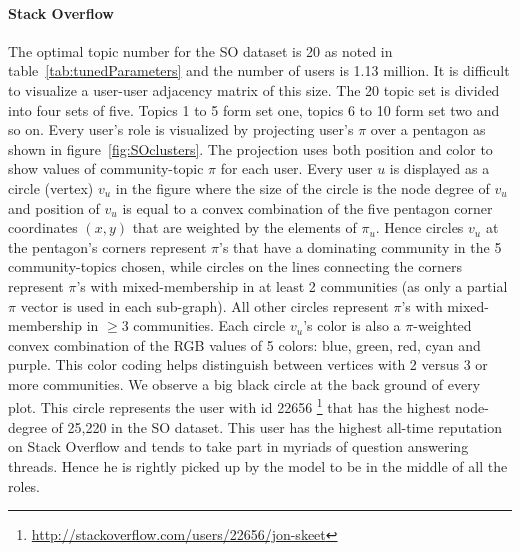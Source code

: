 \documentclass{sig-alternate}
\begin{document}
\vspace*{-0.5\baselineskip}
\paragraph{Stack Overflow} 
The optimal topic number for the SO dataset is 20 as noted in
table~\ref{tab:tunedParameters} and the number of users is 1.13 million. It is
difficult to visualize a user-user adjacency matrix of this size. The 20
topic set is divided into four sets of five. Topics 1 to 5
form set one, topics 6 to 10 form set two and so on. Every user's role is
visualized by projecting user's $\pi$ over a pentagon as shown in
figure~\ref{fig:SOclusters}. The projection uses both position and
color to show values of community-topic $\pi$ for each user.
Every user $u$ is displayed as a circle (vertex) $v_u$ in the figure where the
size of the circle is the node degree of $v_u$ and position of $v_u$ is equal to
a convex combination of the five pentagon corner coordinates $(x, y)$ that are weighted by the
elements of $\pi_u$. Hence circles $v_u$ at the pentagon's corners
represent $\pi$'s that have a dominating community  in the 5
community-topics chosen, while circles on the lines connecting the corners 
represent $\pi$'s with
mixed-membership in at least 2 communities (as only a partial $\pi$ vector is
used in each sub-graph).
All other circles represent $\pi$'s with mixed-membership in $\geq 3$
communities.
Each circle $v_u$'s color is also a $\pi$-weighted convex
combination of the RGB values of 5 colors: blue, green, red, cyan and purple. This
color coding helps distinguish between vertices with 2 versus 3 or more
communities. We observe a big black circle at the back ground of every plot.
This circle represents the user with id 22656
\footnote{\url{http://stackoverflow.com/users/22656/jon-skeet}} that 
has the highest node-degree of 25,220 in the SO dataset. 
This user has the highest all-time reputation on
Stack Overflow and tends to take part in myriads of question answering threads.
Hence he is rightly picked up by the model to be in the middle of all the roles. 
\end{document}
